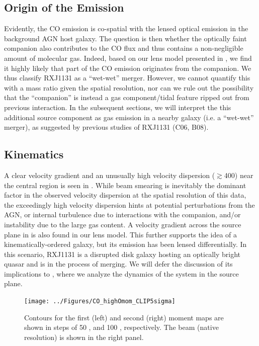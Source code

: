 \documentclass[]{emulateapj}
\begin{document}
\subsection{Origin of the \bco Emission} \label{sec:origin} %
Evidently, the CO emission is co-spatial with the lensed optical emission in
the background AGN host galaxy.
The question is then whether the optically
faint companion also contributes to the CO flux and thus contains a
non-negligible amount of molecular gas.
Indeed, based on our lens model presented in , we find it
highly likely that part of the CO emission originates from
the companion. We thus classify RXJ1131 as a ``wet-wet'' merger.
However, we cannot quantify this with a mass ratio given the
spatial resolution, nor can we rule out the possibility that
the ``companion'' is instead a gas component/tidal feature ripped out
from previous interaction.
In the subsequent sections, we will interpret
the this additional source component as gas emission
in a nearby galaxy (i.e. a ``wet-wet'' merger), as suggested by previous studies of RXJ1131 (C06, B08).

\subsection{\bco Kinematics} %
A clear velocity gradient and an unusually high
velocity dispersion ($\gtrsim$400\kms) near the central region
is seen in . While beam smearing is inevitably the
dominant factor in the observed velocity dispersion
at the spatial resolution of this data, the exceedingly
high velocity dispersion hints
at potential perturbations from the AGN, or internal turbulence due to
interactions with the companion, and/or instability due to the large gas
content. A velocity gradient across the source plane in  is also
found in our lens model. This further supports the idea of a
kinematically-ordered galaxy, but its emission has been lensed differentially.
In this scenario, RXJ1131 is a disrupted disk galaxy hosting an optically
bright quasar and is in the process of merging.
We will defer the discussion of its implications to ,
where we analyze the dynamics of the system in the source plane.

\begin{figure}[!htbp]
\centering
\texttt{[image: ../Figures/CO\_highOmom\_CLIP5sigma]}
\caption{
Contours for the first (left) and second (right) moment maps are shown in steps of
50 \kms, and 100 \kms, respectively. The beam (native resolution) is shown in the right panel.
\label{fig:CO21highO}}
\end{figure}
\end{document}
